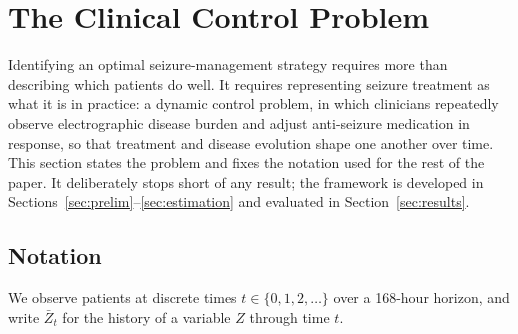 \section{The Clinical Control Problem}
\label{sec:clinical-problem}

Identifying an optimal seizure-management strategy requires more than describing which patients do
well. It requires representing seizure treatment as what it is in practice: a dynamic control
problem, in which clinicians repeatedly observe electrographic disease burden and adjust
anti-seizure medication in response, so that treatment and disease evolution shape one another over
time. This section states the problem and fixes the notation used for the rest of the paper. It
deliberately stops short of any result; the framework is developed in Sections~\ref{sec:prelim}--\ref{sec:estimation}
and evaluated in Section~\ref{sec:results}.

\subsection{Notation}
\label{sec:notation}

We observe patients at discrete times $t \in \{0,1,2,\ldots\}$ over a 168-hour horizon, and write
$\bar{Z}_t$ for the history of a variable $Z$ through time $t$.

